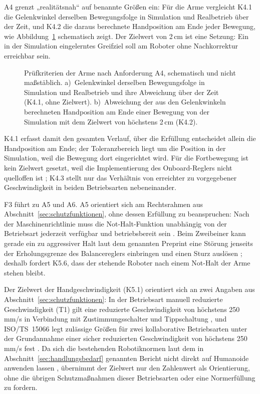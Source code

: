 A4 grenzt „realitätsnah“ auf benannte Größen ein: Für die Arme vergleicht K4.1 die Gelenkwinkel derselben Bewegungsfolge in Simulation und Realbetrieb über der Zeit, und K4.2 die daraus berechnete Handposition am Ende jeder Bewegung, wie Abbildung~\ref{fig:handtoleranz} schematisch zeigt.
Der Zielwert von 2\,cm ist eine Setzung: Ein in der Simulation eingelerntes Greifziel soll am Roboter ohne Nachkorrektur erreichbar sein.

\begin{figure}[!htbp]
  \centering
  
  \caption[Prüfkriterien der Arme nach Anforderung A4]{Prüfkriterien der Arme nach Anforderung A4, schematisch und nicht maßstäblich. a)~Gelenkwinkel derselben Bewegungsfolge in Simulation und Realbetrieb und ihre Abweichung über der Zeit (K4.1, ohne Zielwert). b)~Abweichung der aus den Gelenkwinkeln berechneten Handposition am Ende einer Bewegung von der Simulation mit dem Zielwert von höchstens 2\,cm (K4.2).}
  \label{fig:handtoleranz}
\end{figure}

K4.1 erfasst damit den gesamten Verlauf, über die Erfüllung entscheidet allein die Handposition am Ende; der Toleranzbereich liegt um die Position in der Simulation, weil die Bewegung dort eingerichtet wird.
Für die Fortbewegung ist kein Zielwert gesetzt, weil die Implementierung des Onboard-Reglers nicht quelloffen ist \cite{Hu2026}; K4.3 stellt nur das Verhältnis von erreichter zu vorgegebener Geschwindigkeit in beiden Betriebsarten nebeneinander.

F3 führt zu A5 und A6.
A5 orientiert sich am Rechtsrahmen aus Abschnitt~\ref{sec:schutzfunktionen}, ohne dessen Erfüllung zu beanspruchen: Nach der Maschinenrichtlinie muss die Not-Halt-Funktion unabhängig von der Betriebsart jederzeit verfügbar und betriebsbereit sein \cite{MRL2006}.
Beim Zweibeiner kann gerade ein zu aggressiver Halt laut dem genannten Preprint eine Störung jenseits der Erholungsgrenze des Balancereglers einbringen und einen Sturz auslösen \cite{Ding2026}; deshalb fordert K5.6, dass der stehende Roboter nach einem Not-Halt der Arme stehen bleibt.

Der Zielwert der Handgeschwindigkeit (K5.1) orientiert sich an zwei Angaben aus Abschnitt~\ref{sec:schutzfunktionen}: In der Betriebsart manuell reduzierte Geschwindigkeit (T1) gilt eine reduzierte Geschwindigkeit von höchstens 250\,mm/s in Verbindung mit Zustimmungsschalter und Tippschaltung \cite{DGUV2015}, und ISO/TS~15066 legt zulässige Größen für zwei kollaborative Betriebsarten unter der Grundannahme einer sicher reduzierten Geschwindigkeit von höchstens 250\,mm/s fest \cite{Villani2018}.
Da sich die bestehenden Robotiknormen laut dem in Abschnitt~\ref{sec:handlungsbedarf} genannten Bericht nicht direkt auf Humanoide anwenden lassen \cite{Prather2025}, übernimmt der Zielwert nur den Zahlenwert als Orientierung, ohne die übrigen Schutzmaßnahmen dieser Betriebsarten oder eine Normerfüllung zu fordern.

